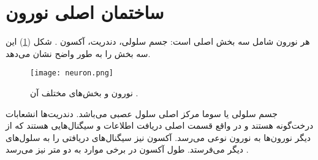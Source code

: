 \section{ساختمان اصلی نورون}
هر نورون شامل سه بخش اصلی است: جسم سلولی، دندریت، آکسون . شکل (\ref{fig:neuron}) این سه بخش را به طور واضح نشان می‌دهد.
\begin{figure} [htbp]
\centering
\texttt{[image: neuron.png]} 
\caption[نورون و بخش‌های مختلف آن] {\footnotesize نورون و بخش‌های مختلف آن \cite{bear}.}
\label{fig:neuron}
\end{figure}
جسم سلولی یا سوما مرکز اصلی سلول عصبی می‌باشد. دندریت‌ها انشعابات درخت‌گونه هستند و در واقع قسمت اصلی دریافت اطلاعات و سیگنال‌هایی هستند که از دیگر نورون‌ها به نورون نوعی می‌رسد. آکسون نیز سیگنال‌های دریافتی را به سلول‌های دیگر می‌فرستد. طول آکسون در برخی موارد به دو متر نیز می‌رسد \cite{kandel}.
‌ %




